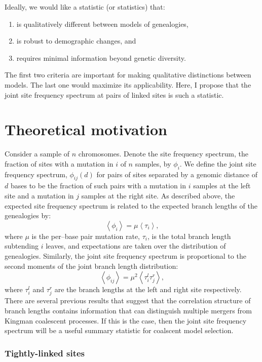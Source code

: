 \documentclass[11pt, letterpaper]{article}   	%
\newcommand{\E}[1]{\left<{#1}\right>}
\begin{document}
Ideally, we would like a statistic (or statistics) that:
\begin{enumerate}
\item is qualitatively different between models of genealogies,
\item is robust to demographic changes, and 
\item requires minimal information beyond genetic diversity.
\end{enumerate}
The first two criteria are important for making qualitative distinctions between models. The last one would maximize its applicability.
Here, I propose that the joint site frequency spectrum at pairs of linked sites is such a statistic.

\section{Theoretical motivation}

Consider a sample of $n$ chromosomes.
Denote the site frequency spectrum, the fraction of sites with a mutation in $i$ of $n$ samples, by $\phi_i$.
We define the joint site frequency spectrum, $\phi_{ij}(d)$ for pairs of sites separated by a genomic distance of $d$ bases to be the fraction of such pairs with a mutation in $i$ samples at the left site and a mutation in $j$ samples at the right site.
As described above, the expected site frequency spectrum is related to the expected branch lengths of the genealogies by:
\begin{equation}
\E{\phi_i} = \mu \E{\tau_i},
\end{equation}
where $\mu$ is the per--base pair mutation rate, $\tau_i$, is the total branch length subtending $i$ leaves, and expectations are taken over the distribution of genealogies.
Similarly, the joint site frequency spectrum is proportional to the second moments of the joint branch length distribution:
\begin{equation}
\E{\phi_{ij}} = \mu^2 \E{\tau_i^l \tau_j^r},
\end{equation}
where $\tau_i^l$ and $\tau_j^r$ are the branch lengths at the left and right site respectively.
There are several previous results that suggest that the correlation structure of branch lengths contains information that can distinguish multiple mergers from Kingman coalescent processes.
If this is the case, then the joint site frequency spectrum will be a useful summary statistic for coalscent model selection.

\subsubsection{Tightly-linked sites}
\end{document}
